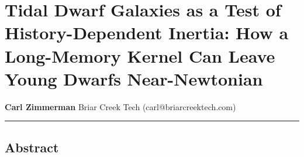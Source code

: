 \documentclass[
]{article}
\author{}
\date{}
\begin{document}
\section{Tidal Dwarf Galaxies as a Test of History-Dependent Inertia:
How a Long-Memory Kernel Can Leave Young Dwarfs
Near-Newtonian}\label{tidal-dwarf-galaxies-as-a-test-of-history-dependent-inertia-how-a-long-memory-kernel-can-leave-young-dwarfs-near-newtonian}

\textbf{Carl Zimmerman} Briar Creek Tech (carl@briarcreektech.com)

\begin{center}\rule{0.5\linewidth}{0.5pt}\end{center}

\subsection{Abstract}\label{abstract}
\end{document}
